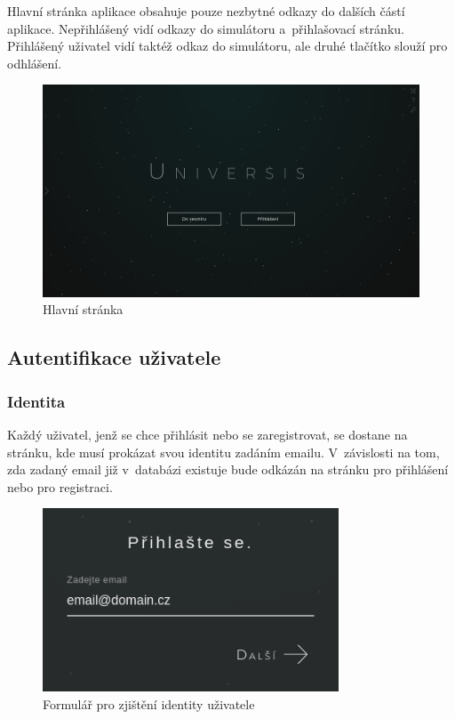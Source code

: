\documentclass[a4paper,12pt]{article}
\begin{document}
Hlavní stránka aplikace obsahuje pouze nezbytné odkazy do dalších částí aplikace. Nepřihlášený vidí odkazy do simulátoru a~přihlašovací stránku. Přihlášený uživatel vidí taktéž odkaz do simulátoru, ale druhé tlačítko slouží pro odhlášení.

\begin{figure}[H]
\begin{center}
\includegraphics[width=450pt]{Images/MainPage.png}
\caption{Hlavní stránka}
\end{center}
\end{figure}

\subsection{Autentifikace uživatele}

\subsubsection{Identita}

Každý uživatel, jenž se chce přihlásit nebo se zaregistrovat, se dostane na stránku, kde musí prokázat svou identitu zadáním emailu. V~závislosti na tom, zda zadaný email již v~databázi existuje bude odkázán na stránku pro přihlášení nebo pro registraci.

\begin{figure}[H]
\begin{center}
\includegraphics[width=250pt]{Images/Identity.png}
\caption{Formulář pro zjištění identity uživatele}
\label{Identity}
\end{center}
\end{figure}
\end{document}
